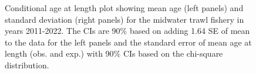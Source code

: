 \documentclass[
]{scrartcl}
\begin{document}
\begin{figure}[H]


\caption{\label{fig-call-plot-midt1}Conditional age at length plot
showing mean age (left panels) and standard deviation (right panels) for
the midwater trawl fishery in years 2011-2022. The CIs are 90\% based on
adding 1.64 SE of mean to the data for the left panels and the standard
error of mean age at length (obs. and exp.) with 90\% CIs based on the
chi-square distribution.}

\end{figure}%
\end{document}

